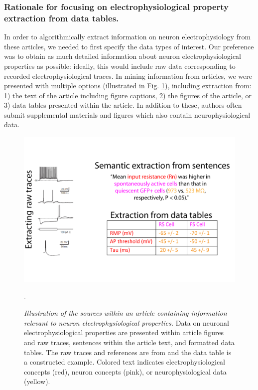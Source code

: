 \documentclass{template/frontiersSCNS} %
\begin{document}
\subsubsection{Rationale for focusing on electrophysiological property extraction from data tables.}
In order to algorithmically extract information on neuron electrophysiology from these articles, we needed to first specify the data types of interest.  
Our preference was to obtain as much detailed information about neuron electrophysiological properties as possible: 
ideally, this would include raw data corresponding to recorded electrophysiological traces. 
In mining information from articles, we were presented with multiple options (illustrated in Fig. \ref{content_types}), including extraction from: 
1) the text of the article including figure captions, 
2) the figures of the article, or 
3) data tables presented within the article.  
In addition to these, authors often submit supplemental materials and figures which also contain neurophysiological data.  

\begin{figure}
\centering
\includegraphics[scale = .8]{./figures/SMeth1_extraction_content_example.jpg}
\caption{\textit{Illustration of the sources within an article containing information relevant to neuron electrophysiological properties.}  
Data on neuronal electrophysiological properties are presented within article figures and raw traces, sentences within the article text, and formatted data tables.  
The raw traces and references are from \citet{van_brederode_gad67-gfp+_2011} and the data table is a constructed example.  
Colored text indicates electrophysiological concepts (red), neuron concepts (pink), or neurophysiological data (yellow).}.
\label{content_types}
\end{figure}
\end{document}
